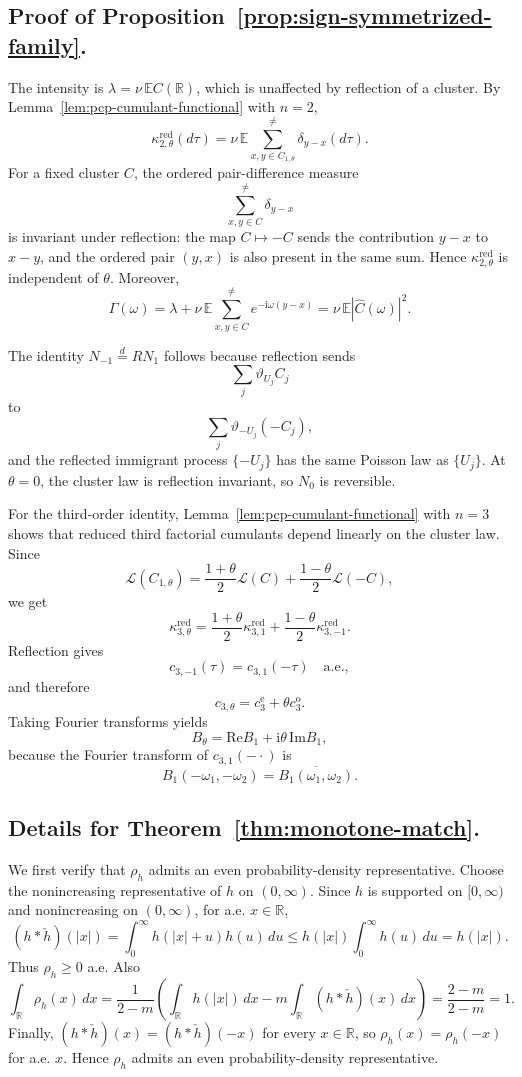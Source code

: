 \documentclass[aap,press]{apt} \volno{00} \partno{00}
\newcommand{\E}{\mathbb{E}}
\newcommand{\R}{\mathbb{R}}
\renewcommand{\ii}{\mathrm{i}}
\newcommand{\1}{\mathbf{1}}
\newcommand{\Law}{\mathcal{L}}
\newcommand{\Ree}{\mathrm{Re}}
\newcommand{\Imm}{\mathrm{Im}}
\numberwithin{equation}{section}
\begin{document}
\subsection{Proof of Proposition~\ref{prop:sign-symmetrized-family}.}
The intensity is $\lambda=\nu\,\E C(\R)$, which is unaffected by reflection of a cluster. By Lemma~\ref{lem:pcp-cumulant-functional} with $n=2$,
\[
\kappa_{2,\theta}^{\mathrm{red}}(d\tau)
=
\nu\,\E\sum_{x,y\in C_{1,\theta}}^{\neq}\delta_{y-x}(d\tau).
\]
For a fixed cluster $C$, the ordered pair-difference measure
\[
\sum_{x,y\in C}^{\neq}\delta_{y-x}
\]
is invariant under reflection: the map $C\mapsto -C$ sends the contribution $y-x$ to $x-y$, and the ordered pair $(y,x)$ is also present in the same sum. Hence $\kappa_{2,\theta}^{\mathrm{red}}$ is independent of $\theta$. Moreover,
\[
\Gamma(\omega)
=
\lambda+
\nu\,\E\sum_{x,y\in C}^{\neq}e^{-\ii\omega(y-x)}
=
\nu\,\E|\widehat C(\omega)|^2 .
\]

The identity $N_{-1}\stackrel d=RN_1$ follows because reflection sends
\[
\sum_j\vartheta_{U_j}C_j
\]
to
\[
\sum_j\vartheta_{-U_j}(-C_j),
\]
and the reflected immigrant process $\{-U_j\}$ has the same Poisson law as $\{U_j\}$. At $\theta=0$, the cluster law is reflection invariant, so $N_0$ is reversible.

For the third-order identity, Lemma~\ref{lem:pcp-cumulant-functional} with $n=3$ shows that reduced third factorial cumulants depend linearly on the cluster law. Since
\[
\Law(C_{1,\theta})=\frac{1+\theta}{2}\Law(C)+\frac{1-\theta}{2}\Law(-C),
\]
we get
\[
\kappa_{3,\theta}^{\mathrm{red}}
=
\frac{1+\theta}{2}\kappa_{3,1}^{\mathrm{red}}
+
\frac{1-\theta}{2}\kappa_{3,-1}^{\mathrm{red}}.
\]
Reflection gives
\[
c_{3,-1}(\tau)=c_{3,1}(-\tau)\quad\text{a.e.},
\]
and therefore
\[
c_{3,\theta}=c_3^{\mathrm e}+\theta c_3^{\mathrm o}.
\]
Taking Fourier transforms yields
\[
B_\theta=\Ree B_1+\ii\theta\,\Imm B_1,
\]
because the Fourier transform of $c_{3,1}(-\cdot)$ is
\[
B_1(-\omega_1,-\omega_2)=\overline{B_1(\omega_1,\omega_2)}.
\]

\subsection{Details for Theorem~\ref{thm:monotone-match}.}
We first verify that $\rho_h$ admits an even probability-density representative. Choose the nonincreasing representative of $h$ on $(0,\infty)$. Since $h$ is supported on $[0,\infty)$ and nonincreasing on $(0,\infty)$, for a.e. $x\in\R$,
\[
(h*\check h)(|x|)
=
\int_{0}^{\infty} h(|x|+u)h(u)\,du
\le h(|x|)\int_{0}^{\infty}h(u)\,du
=
h(|x|).
\]
Thus $\rho_h\ge0$ a.e. Also
\[
\int_{\R} \rho_h(x)\,dx
=
\frac{1}{2-m}\left(\int_{\R}h(|x|)\,dx-m\int_{\R}(h*\check h)(x)\,dx\right)
=
\frac{2-m}{2-m}=1.
\]
Finally, $(h*\check h)(x)=(h*\check h)(-x)$ for every $x\in\R$, so $\rho_h(x)=\rho_h(-x)$ for a.e. $x$. Hence $\rho_h$ admits an even probability-density representative.
\end{document}

